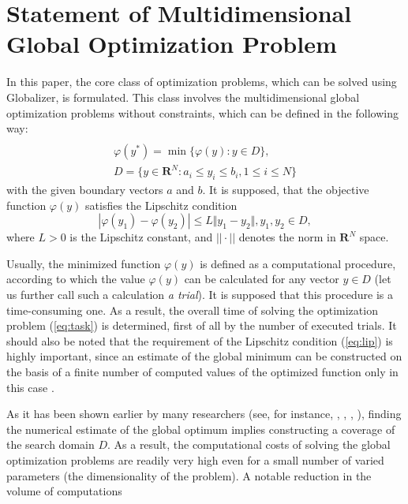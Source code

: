 \documentclass[runningheads]{llncs}
\begin{document}
\section{Statement of Multidimensional Global Optimization Problem}
In this paper, the core class of optimization problems, which can be solved using
Globalizer\cite{globalizerSystem}, is formulated. This class involves the multidimensional global
optimization problems without constraints, which can be defined in the following way:
\begin{equation}
\label{eq:task}
\begin{array}{cr}\\
  \varphi(y^*)=\min\{\varphi(y):y\in D\}, \\
  D=\{y\in \mathbf{R}^N:a_i\leq y_i\leq{b_i}, 1\leq{i}\leq{N}\}
\end{array}
\end{equation}
with the given boundary vectors  $a$ and  $b$. It is supposed, that the objective function \(\varphi(y)\) satisfies the Lipschitz condition
\begin{equation}
\label{eq:lip}
|\varphi(y_1)-\varphi(y_2)|\leq L\Vert y_1-y_2\Vert,y_1,y_2\in D,
\end{equation}
where \(L>0\) is the Lipschitz constant, and \(||\cdot||\) denotes the norm in \(\mathbf{R}^N\) space.
\par
Usually, the minimized function \(\varphi(y)\) is defined as a computational procedure,
according to which the value \(\varphi(y)\) can be calculated for any vector \(y\in D\)
(let us further call such a calculation \textit{a trial}). It is supposed that this procedure
is a time-consuming one. As a result, the overall time of solving the optimization
problem (\ref{eq:task}) is determined, first of all by the number of executed trials.
It should also be noted that the requirement of the Lipschitz condition (\ref{eq:lip})
is highly important, since an estimate of the global minimum can be constructed on the
basis of a finite number of computed values of the optimized function only in this case .
\par
As it has been shown earlier by many researchers
(see, for instance, \cite{floudasPardalosGOState}, \cite{horstTuyGO}, \cite{pinterGO}, \cite{strSergGO}),
finding the numerical estimate of the global optimum implies constructing a coverage of
the search domain \(D\). As a result, the computational costs of solving the global
optimization problems are readily very high even for a small number of varied parameters
(the dimensionality of the problem). A notable reduction in the volume of computations
\end{document}
